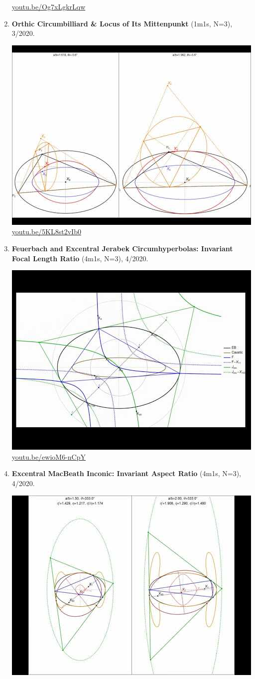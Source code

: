 \documentclass[12pt]{amsart}
\begin{document}
\begin{enumerate}[resume]
\begin{center}
\href{https://youtu.be/Og7xLgkrLqw}{\url{youtu.be/Og7xLgkrLqw}}\end{center}
% 
\item \textbf{Orthic Circumbilliard \& Locus of Its Mittenpunkt} (1m1s, N=3), 3/2020. 
\begin{center}\includegraphics[width=.5\textwidth]{pics/5KL8st2vIb0.jpg} \\ 
\href{https://youtu.be/5KL8st2vIb0}{\url{youtu.be/5KL8st2vIb0}}\end{center}
% 
\item \textbf{Feuerbach and Excentral Jerabek Circumhyperbolas: Invariant Focal Length Ratio} (4m1s, N=3), 4/2020. 
\begin{center}\includegraphics[width=.5\textwidth]{pics/ewioM6-nCpY.jpg} \\ 
\href{https://youtu.be/ewioM6-nCpY}{\url{youtu.be/ewioM6-nCpY}}\end{center}
% 
\item \textbf{Excentral MacBeath Inconic: Invariant Aspect Ratio} (4m1s, N=3), 4/2020. 
\begin{center}\includegraphics[width=.5\textwidth]{pics/IxrIkW5tj20.jpg} \\ 

\end{center}
\end{enumerate}
\end{document}
